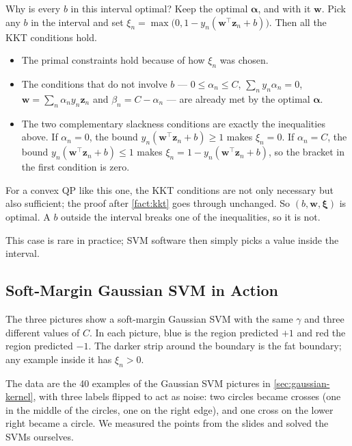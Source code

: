 Why is every \(b\) in this interval optimal? Keep the optimal
\(\bm{\alpha}\), and with it \(\bm{w}\). Pick any \(b\) in the interval and
set \(\xi_n = \max\bigl(0, 1 - y_n (\bm{w}^\top \bm{z}_n + b)\bigr)\). Then
all the KKT conditions hold.
\begin{itemize}
    \item The primal constraints hold because of how \(\xi_n\) was chosen.
    \item The conditions that do not involve \(b\) --- \(0 \le \alpha_n \le
        C\), \(\sum_n y_n \alpha_n = 0\), \(\bm{w} = \sum_n \alpha_n y_n
        \bm{z}_n\) and \(\beta_n = C - \alpha_n\) --- are already met by the
        optimal \(\bm{\alpha}\).
    \item The two complementary slackness conditions are exactly the
        inequalities above. If \(\alpha_n = 0\), the bound \(y_n
        (\bm{w}^\top \bm{z}_n + b) \ge 1\) makes \(\xi_n = 0\). If \(\alpha_n
        = C\), the bound \(y_n (\bm{w}^\top \bm{z}_n + b) \le 1\) makes
        \(\xi_n = 1 - y_n (\bm{w}^\top \bm{z}_n + b)\), so the bracket in
        the first condition is zero.
\end{itemize}
For a convex QP like this one, the KKT conditions are not only necessary
but also sufficient; the proof after \autoref{fact:kkt} goes through
unchanged. So \((b, \bm{w}, \bm{\xi})\) is optimal. A \(b\) outside the
interval breaks one of the inequalities, so it is not.

This case is rare in practice; SVM software then simply picks a value inside
the interval.


\subsection{Soft-Margin Gaussian SVM in Action}

The three pictures show a soft-margin Gaussian SVM with the same \(\gamma\)
and three different values of \(C\). In each picture, blue is the region
predicted \(+1\) and red the region predicted \(-1\). The darker strip around
the boundary is the fat boundary; any example inside it has \(\xi_n > 0\).

\begin{note}
    The data are the 40 examples of the Gaussian SVM pictures in
    \autoref{sec:gaussian-kernel}, with three labels flipped to act as noise:
    two circles became crosses (one in the middle of the circles, one on the
    right edge), and one cross on the lower right became a circle. We
    measured the points from the slides and solved the SVMs ourselves.
\end{note}

